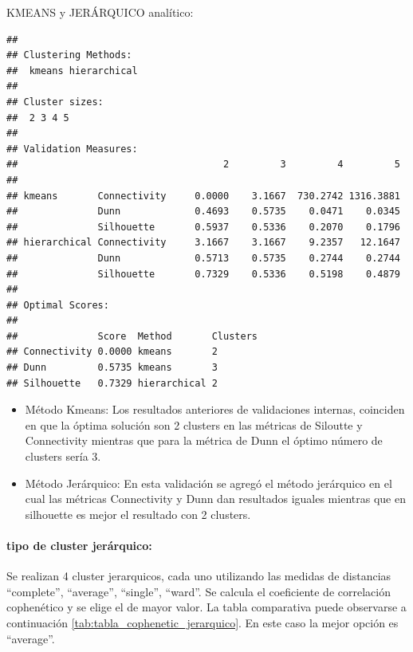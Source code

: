 \clearpage



KMEANS y JERÁRQUICO analítico:\label{kmeas_jerarquico_numoptimal}

\begin{lstlisting}
## 
## Clustering Methods:
##  kmeans hierarchical 
## 
## Cluster sizes:
##  2 3 4 5 
## 
## Validation Measures:
##                                    2         3         4         5
##                                                                   
## kmeans       Connectivity     0.0000    3.1667  730.2742 1316.3881
##              Dunn             0.4693    0.5735    0.0471    0.0345
##              Silhouette       0.5937    0.5336    0.2070    0.1796
## hierarchical Connectivity     3.1667    3.1667    9.2357   12.1647
##              Dunn             0.5713    0.5735    0.2744    0.2744
##              Silhouette       0.7329    0.5336    0.5198    0.4879
## 
## Optimal Scores:
## 
##              Score  Method       Clusters
## Connectivity 0.0000 kmeans       2       
## Dunn         0.5735 kmeans       3       
## Silhouette   0.7329 hierarchical 2
\end{lstlisting}

\begin{itemize}
	\item
	Método Kmeans: Los resultados anteriores de validaciones internas,
	coinciden en que la óptima solución son 2 clusters en las
	métricas de Siloutte y Connectivity mientras que para la métrica de
	Dunn el óptimo número de clusters sería 3.
	\item
	Método Jerárquico: En esta validación se agregó el método jerárquico en el cual las métricas Connectivity y Dunn dan resultados iguales 	mientras que en silhouette es mejor el resultado con 2 clusters.
\end{itemize}

\paragraph{\textbf{tipo de cluster jerárquico:}}
Se realizan 4 cluster jerarquicos, cada uno utilizando las medidas de distancias ``complete'', ``average'', ``single'', ``ward''. Se calcula el coeficiente de correlación cophenético y se elige el de mayor valor. La tabla comparativa puede observarse a continuación \ref{tab:tabla_cophenetic_jerarquico}. En este caso la mejor opción es ``average''. 

